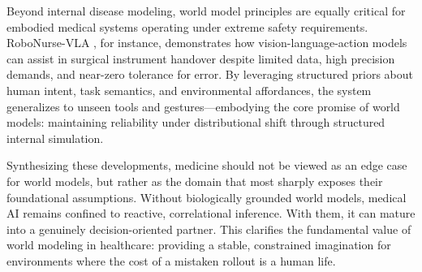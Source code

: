 \documentclass[pdflatex,sn-mathphys-num]{sn-jnl}
\theoremstyle{thmstyleone}%
\theoremstyle{thmstyletwo}%
\theoremstyle{thmstylethree}%
\begin{document}
Beyond internal disease modeling, world model principles are equally critical for embodied medical systems operating under extreme safety requirements. RoboNurse-VLA \citep{robonurse}, for instance, demonstrates how vision-language-action models can assist in surgical instrument handover despite limited data, high precision demands, and near-zero tolerance for error. By leveraging structured priors about human intent, task semantics, and environmental affordances, the system generalizes to unseen tools and gestures—embodying the core promise of world models: maintaining reliability under distributional shift through structured internal simulation.

Synthesizing these developments, medicine should not be viewed as an edge case for world models, but rather as the domain that most sharply exposes their foundational assumptions. Without biologically grounded world models, medical AI remains confined to reactive, correlational inference. With them, it can mature into a genuinely decision-oriented partner. This clarifies the fundamental value of world modeling in healthcare: providing a stable, constrained imagination for environments where the cost of a mistaken rollout is a human life.



\end{document}
